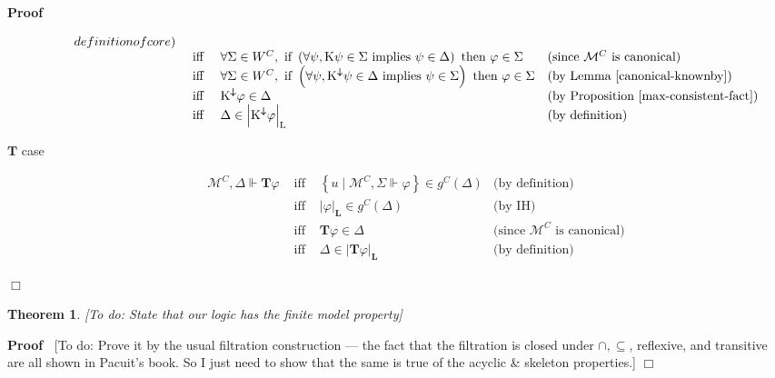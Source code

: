 \documentclass{article}
\newcommand{\infixiff}{\text{ iff }}
\newcommand{\tmmathbf}[1]{\ensuremath{\boldsymbol{#1}}}
\newcommand{\todo}[1]{{\color{red!75!black}[To do: #1]}}
\newenvironment{proof}{\noindent\textbf{Proof\ }}{\hspace*{\fill}$\Box$\medskip}
\newtheorem{theorem}{Theorem}
\providecommand{\infixiff}{\mathbin{\text{ iff }}}
\newcommand{\Model}{\ensuremath{\mathcal{M}}}
\newcommand{\Logic}{\ensuremath{\tmmathbf{\text{L}}}}
\newcommand{\Know}{\tmmathbf{\text{K}}}
\newcommand{\Knownby}{\tmmathbf{\text{K}^{\downarrow}}}
\newcommand{\Typ}{\ensuremath{\tmmathbf{\text{T}}}}
\begin{document}
\begin{proof}
\begin{description}
\[\begin{array}{llll}
{         definition of core)}\\
         & \infixiff & \forall \Sigma \in W^C, \text{ if } \left( \forall
         \psi, \Know \psi \in \Sigma \text{ implies } \psi \in \Delta \right)
         \text{ then } \varphi \in \Sigma & \text{(since $\Model^C$ is
         canonical)}\\
         & \infixiff & \forall \Sigma \in W^C, \text{ if } \left( \forall
         \psi, \Knownby \psi \in \Delta \text{ implies } \psi \in \Sigma
         \right) \text{ then } \varphi \in \Sigma & \text{(by Lemma
         \ref{canonical-knownby})}\\
         & \infixiff & \Knownby \varphi \in \Delta & \text{(by Proposition
         \ref{max-consistent-fact})}\\
         & \infixiff & \Delta \in \left| \Knownby \varphi \right|_{\Logic} &
         \text{(by definition)}
       \end{array} \]
    \item[{\Typ} case]
    \[ \begin{array}{llll}
         \Model^C, \Delta \Vdash \Typ \varphi & \infixiff & \left\{ u \mid
         \Model^C, \Sigma \Vdash \varphi \right\} \in g^C (\Delta) & \text{(by
         definition)}\\
         & \infixiff & | \varphi |_{\Logic} \in g^C (\Delta) & \text{(by
         IH)}\\
         & \infixiff & \Typ \varphi \in \Delta & \text{(since $\Model^C$ is
         canonical)}\\
         & \infixiff & \Delta \in \left| \Typ \varphi \right|_{\Logic} &
         \text{(by definition)}
       \end{array} \]
  \end{description}
  
\end{proof}

\begin{theorem}
  \label{finite-model-property}{\todo{State that our logic has the finite
  model property}}
\end{theorem}

\begin{proof}
  {\todo{Prove it by the usual filtration construction --- the fact that the
  filtration is closed under $\cap, \subseteq$, reflexive, and transitive are
  all shown in Pacuit's book. So I just need to show that the same is true of
  the acyclic \& skeleton properties.}}
\end{proof}
\end{document}
